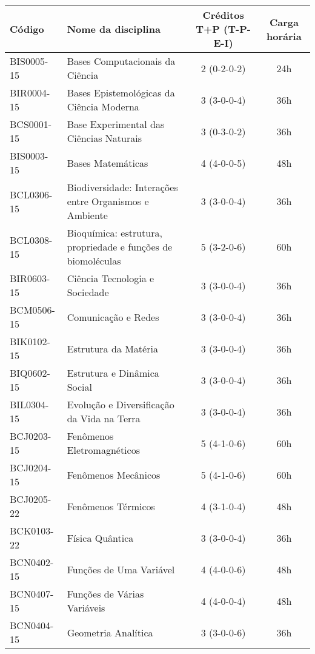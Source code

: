 \begin{table}[h!]
    \centering
    \begin{tabular}{|l|p{}|c|c|}
        \hline
        \textbf{Código} & \textbf{Nome da disciplina} & \textbf{Créditos T+P (T-P-E-I)} & \textbf{Carga horária}\\
        \hline\hline
        BIS0005-15 & Bases Computacionais da Ciência & 2 (0-2-0-2) & 24h\\
        \hline
        BIR0004-15 & Bases Epistemológicas da Ciência Moderna & 3 (3-0-0-4) & 36h\\
        \hline
        BCS0001-15 & Base Experimental das Ciências Naturais & 3 (0-3-0-2) & 36h\\
        \hline
        BIS0003-15 & Bases Matemáticas & 4 (4-0-0-5) & 48h\\
        \hline
        BCL0306-15 & Biodiversidade: Interações entre Organismos e Ambiente & 3 (3-0-0-4) & 36h\\
        \hline
        BCL0308-15 & Bioquímica: estrutura, propriedade e funções de biomoléculas & 5 (3-2-0-6) & 60h\\
        \hline
        BIR0603-15 & Ciência Tecnologia e Sociedade & 3 (3-0-0-4) & 36h\\
        \hline
        BCM0506-15 & Comunicação e Redes & 3 (3-0-0-4) & 36h\\
        \hline
        BIK0102-15 & Estrutura da Matéria & 3 (3-0-0-4) & 36h\\
        \hline
        BIQ0602-15 & Estrutura e Dinâmica Social & 3 (3-0-0-4) & 36h \\
        \hline
        BIL0304-15 & Evolução e Diversificação da Vida na Terra & 3 (3-0-0-4) & 36h\\
        \hline
        BCJ0203-15 & Fenômenos Eletromagnéticos & 5 (4-1-0-6) & 60h\\
        \hline
        BCJ0204-15 & Fenômenos Mecânicos & 5 (4-1-0-6) & 60h \\
        \hline
        BCJ0205-22 & Fenômenos Térmicos & 4 (3-1-0-4) & 48h\\
        \hline
        BCK0103-22 & Física Quântica & 3 (3-0-0-4) & 36h\\
        \hline
        BCN0402-15 & Funções de Uma Variável & 4 (4-0-0-6) & 48h\\
        \hline
        BCN0407-15 & Funções de Várias Variáveis & 4 (4-0-0-4) & 48h \\
        \hline
        BCN0404-15 & Geometria Analítica & 3 (3-0-0-6) & 36h\\
        \hline

\end{tabular}
\end{table}
